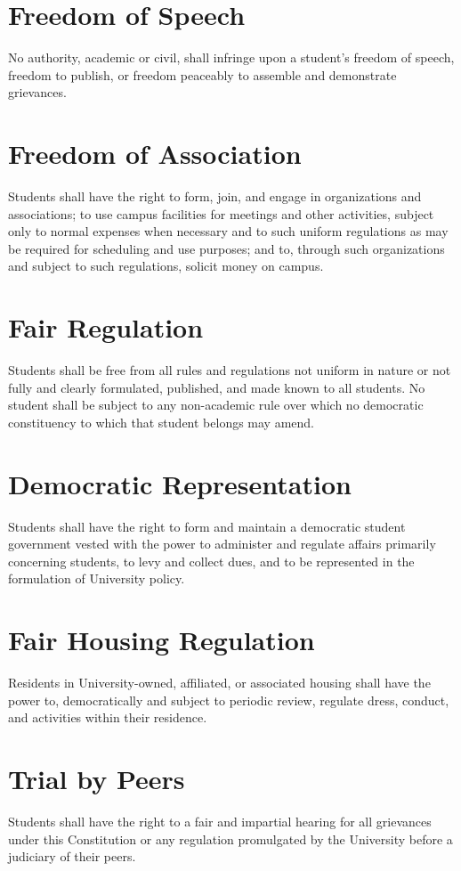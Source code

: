 \section{Freedom of Speech}
    No authority, academic or civil, shall infringe upon a student's freedom of speech, freedom to publish, or freedom peaceably to assemble and demonstrate grievances.

\section{Freedom of Association}
    Students shall have the right to form, join, and engage in organizations and associations; to use campus facilities for meetings and other activities, subject only to normal expenses when necessary and to such uniform regulations as may be required for scheduling and use purposes; and to, through such organizations and subject to such regulations, solicit money on campus.

\section{Fair Regulation}
    Students shall be free from all rules and regulations not uniform in nature or not fully and clearly formulated, published, and made known to all students. No student shall be subject to any non-academic rule over which no democratic constituency to which that student belongs may amend.

\section{Democratic Representation}
    Students shall have the right to form and maintain a democratic student government vested with the power to administer and regulate affairs primarily concerning students, to levy and collect dues, and to be represented in the formulation of University policy.

\section{Fair Housing Regulation}
    Residents in University-owned, affiliated, or associated housing shall have the power to, democratically and subject to periodic review, regulate dress, conduct, and activities within their residence.

\section{Trial by Peers}
    Students shall have the right to a fair and impartial hearing for all grievances under this Constitution or any regulation promulgated by the University before a judiciary of their peers.

